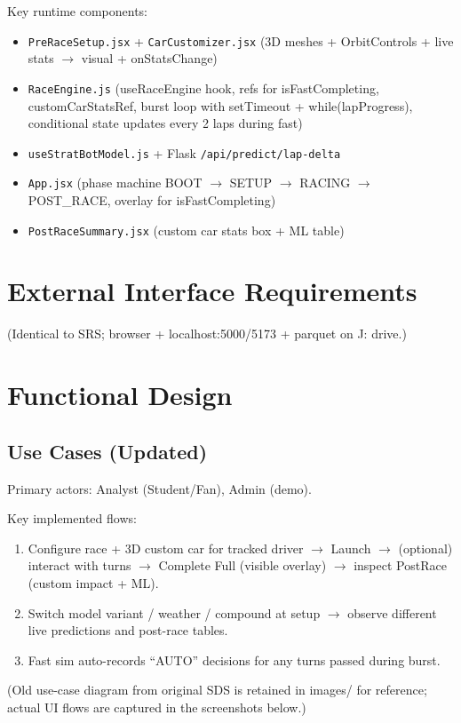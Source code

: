 \documentclass[12pt,a4paper]{article}
\begin{document}
Key runtime components:
\begin{itemize}
\item \texttt{PreRaceSetup.jsx} + \texttt{CarCustomizer.jsx} (3D meshes + OrbitControls + live stats $\to$ visual + onStatsChange)
\item \texttt{RaceEngine.js} (useRaceEngine hook, refs for isFastCompleting, customCarStatsRef, burst loop with setTimeout + while(lapProgress), conditional state updates every 2 laps during fast)
\item \texttt{useStratBotModel.js} + Flask \texttt{/api/predict/lap-delta}
\item \texttt{App.jsx} (phase machine BOOT $\to$ SETUP $\to$ RACING $\to$ POST\_RACE, overlay for isFastCompleting)
\item \texttt{PostRaceSummary.jsx} (custom car stats box + ML table)
\end{itemize}

\section{External Interface Requirements}
(Identical to SRS; browser + localhost:5000/5173 + parquet on J: drive.)

\section{Functional Design}
\subsection{Use Cases (Updated)}
Primary actors: Analyst (Student/Fan), Admin (demo).

Key implemented flows:
\begin{enumerate}
\item Configure race + 3D custom car for tracked driver $\to$ Launch $\to$ (optional) interact with turns $\to$ Complete Full (visible overlay) $\to$ inspect PostRace (custom impact + ML).
\item Switch model variant / weather / compound at setup $\to$ observe different live predictions and post-race tables.
\item Fast sim auto-records ``AUTO'' decisions for any turns passed during burst.
\end{enumerate}

(Old use-case diagram from original SDS is retained in images/ for reference; actual UI flows are captured in the screenshots below.)
\end{document}
